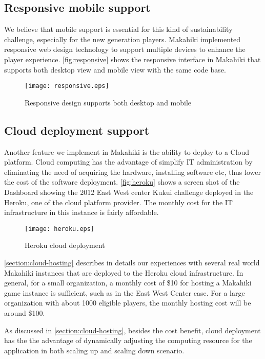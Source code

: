 \clearpage

\subsection{Responsive mobile support}
We believe that mobile support is essential for this kind of sustainability challenge, especially for the new generation players. Makahiki implemented  responsive web design technology to support multiple devices to enhance the player experience. \autoref{fig:responsive} shows the responsive interface in Makahiki that supports both desktop view and mobile view with the same code base.

\begin{figure}[!ht]
  \center
  \texttt{[image: responsive.eps]}
  \caption{Responsive design supports both desktop and mobile}
  \label{fig:responsive}
\end{figure}

\clearpage

\subsection{Cloud deployment support}
Another feature we implement in Makahiki is the ability to deploy to a Cloud platform. Cloud computing has the advantage of simplify IT administration by eliminating the need of acquiring the hardware, installing software etc, thus lower the cost of the software deployment. \autoref{fig:heroku} shows a screen shot of the Dashboard showing the 2012 East West center Kukui challenge deployed in the Heroku, one of the cloud platform provider. The monthly cost for the IT infrastructure in this instance is fairly affordable. 

\begin{figure}[!ht]
  \center
  \texttt{[image: heroku.eps]}
  \caption{Heroku cloud deployment}
  \label{fig:heroku}
\end{figure}

\autoref{section:cloud-hosting} describes in details our experiences with several real world Makahiki instances that are deployed to the Heroku cloud infrastructure. In general, for a small organization, a monthly cost of \$10 for hosting a Makahiki game instance is sufficient, such as in the East West Center case. For a large organization with about 1000 eligible players, the monthly hosting cost will be around \$100. 

As discussed in \autoref{section:cloud-hosting}, besides the cost benefit, cloud deployment has the the advantage of dynamically adjusting the computing resource for the application in both scaling up and scaling down scenario. 

